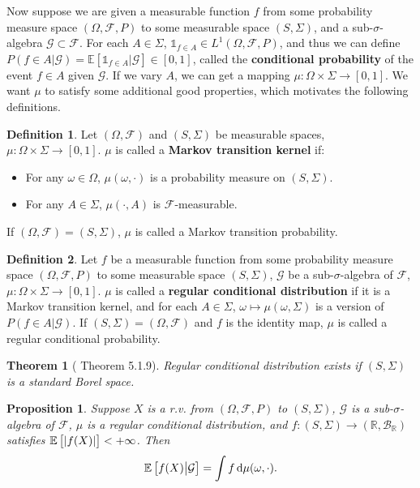 \documentclass[openany]{book}
\newtheorem{proposition}{Proposition}[chapter]
\newtheorem{theorem}{Theorem}[chapter]
\theoremstyle{definition}
\newtheorem{definition}{Definition}[chapter]
\theoremstyle{remark}
\begin{document}
Now suppose we are given a measurable function $f$ from some probability measure space $(\Omega,\mathcal{F},P)$ to some measurable space $(S,\Sigma)$, and a sub-$\sigma$-algebra $\mathcal{G}\subset \mathcal{F}$. For each $A\in\Sigma$, $\mathds{1}_{f\in A}\in L^1(\Omega,\mathcal{F},P)$, and thus we can define $P(f\in A|\mathcal{G})=\mathbb{E}[\mathds{1}_{f\in A}|\mathcal{G}]\in[0,1]$, called the \textbf{conditional probability} of the event $f\in A$ given $\mathcal{G}$. If we vary $A$, we can get a mapping $\mu:\Omega\times\Sigma\to[0,1]$. We want $\mu$ to satisfy some additional good properties, which motivates the following definitions.
\begin{definition}
    Let $(\Omega,\mathcal{F})$ and $(S,\Sigma)$ be measurable spaces, $\mu:\Omega\times\Sigma\to[0,1]$.  $\mu$ is called a \textbf{Markov transition kernel} if:
    \begin{itemize}
        \item For any $\omega\in\Omega$, $\mu(\omega,\cdot)$ is a probability measure on $(S,\Sigma)$.
        \item For any $A\in\Sigma$, $\mu(\cdot,A)$ is $\mathcal{F}$-measurable.
    \end{itemize}
    If $(\Omega,\mathcal{F})=(S,\Sigma)$, $\mu$ is called a Markov transition probability.
\end{definition}
\begin{definition}
    Let $f$ be a measurable function from some probability measure space $(\Omega,\mathcal{F},P)$ to some measurable space $(S,\Sigma)$, $\mathcal{G}$ be a sub-$\sigma$-algebra of $\mathcal{F}$, $\mu:\Omega\times\Sigma\to[0,1]$. $\mu$ is called a \textbf{regular conditional distribution} if it is a Markov transition kernel, and for each $A\in\Sigma$, $\omega\mapsto\mu(\omega,\Sigma)$ is a version of $P(f\in A|\mathcal{G})$.
    If $(S,\Sigma)=(\Omega,\mathcal{F})$ and $f$ is the identity map, $\mu$ is called a regular conditional probability.
\end{definition}
\begin{theorem}[\cite{D10} Theorem 5.1.9]
    Regular conditional distribution exists if $(S,\Sigma)$ is a standard Borel space.
\end{theorem}
\begin{proposition}
    Suppose $X$ is a r.v. from $(\Omega,\mathcal{F},P)$ to $(S,\Sigma)$, $\mathcal{G}$ is a sub-$\sigma$-algebra of $\mathcal{F}$, $\mu$ is a regular conditional distribution, and $f:(S,\Sigma)\to(\mathbb{R},\mathcal{B}_{\mathbb{R}})$ satisfies $\mathbb{E}\sbr{|f(X)|}<+\infty$. Then
    \begin{equation*}
        \mathbb{E}\sbr{f(X)\middle|\mathcal{G}}=\int f\dif\mu(\omega,\cdot).
    \end{equation*}
\end{proposition}
\end{document}
